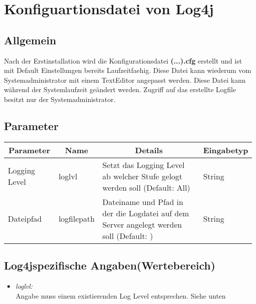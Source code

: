 \section{Konfiguartionsdatei von Log4j}	

\subsection{Allgemein}

Nach der Erstinstallation wird die Konfigurationsdatei \textbf{(...).cfg} erstellt und ist mit Default Einstellungen bereits Laufzeitfaehig. Diese Datei kann wiederum vom Systemadministrator mit einem TextEditor angepasst werden. Diese Datei kann während der Systemlaufzeit geändert werden. Zugriff auf das erstellte Logfile besitzt nur der Systemadministrator.

\subsection{Parameter}

\begin{center}
	\begin{longtable}{|p{4cm} | p{3cm}| p{7cm} | p{2cm} |}
	\hline
	\multicolumn{1}{|c|}{\textbf{Parameter}} & \multicolumn{1}{c|}{\textbf{Name}} & \multicolumn{1}{c|}{\textbf{Details}} & \multicolumn{1}{c|}{\textbf{Eingabetyp}}
	\\ \hline
	Logging Level & loglvl & Setzt das Logging Level ab welcher Stufe gelogt werden soll (Default: All) & String \\ \hline
	Dateipfad & logfilepath & Dateiname und Pfad in der die Logdatei auf dem Server angelegt werden soll (Default: ) & String \\ \hline
	
\end{longtable}

\end{center}

\subsection{Log4jspezifische Angaben(Wertebereich)}

\begin{itemize}
	\item \emph{loglvl:}\\
	Angabe muss einem existierenden Log Level entsprechen. Siehe unten
\end{itemize}

